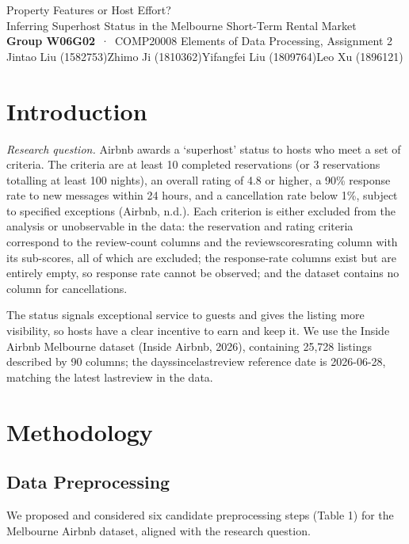 \documentclass[final,1p,11pt]{elsarticle}
\renewcommand\_{\textunderscore\allowbreak}%
\begin{document}
\begin{center}
{\LARGE Property Features or Host Effort?}\\[4pt]
{\Large Inferring Superhost Status in the Melbourne Short-Term Rental Market}\\[10pt]
{\normalsize\textbf{Group W06G02} \,·\, COMP20008 Elements of Data Processing, Assignment 2}\\[3pt]
{\normalsize Jintao Liu (1582753)\quad Zhimo Ji (1810362)\quad Yifangfei Liu (1809764)\quad Leo Xu (1896121)}
\end{center}
\vspace{0pt}

\section{Introduction}

\noindent\textit{Research question.} Airbnb awards a ‘superhost’ status to hosts who meet a set of criteria. The criteria are at least 10 completed reservations (or 3 reservations totalling at least 100 nights), an overall rating of 4.8 or higher, a 90\% response rate to new messages within 24 hours, and a cancellation rate below 1\%, subject to specified exceptions (Airbnb, n.d.). Each criterion is either excluded from the analysis or unobservable in the data: the reservation and rating criteria correspond to the review-count columns and the review\_scores\_rating column with its sub-scores, all of which are excluded; the response-rate columns exist but are entirely empty, so response rate cannot be observed; and the dataset contains no column for cancellations.

The status signals exceptional service to guests and gives the listing more visibility, so hosts have a clear incentive to earn and keep it. We use the Inside Airbnb Melbourne dataset (Inside Airbnb, 2026), containing 25,728 listings described by 90 columns; the days\_since\_last\_review reference date is 2026-06-28, matching the latest last\_review in the data.

\section{Methodology}

\subsection{Data Preprocessing}

We proposed and considered six candidate preprocessing steps (Table 1) for the Melbourne Airbnb dataset, aligned with the research question.
\end{document}

